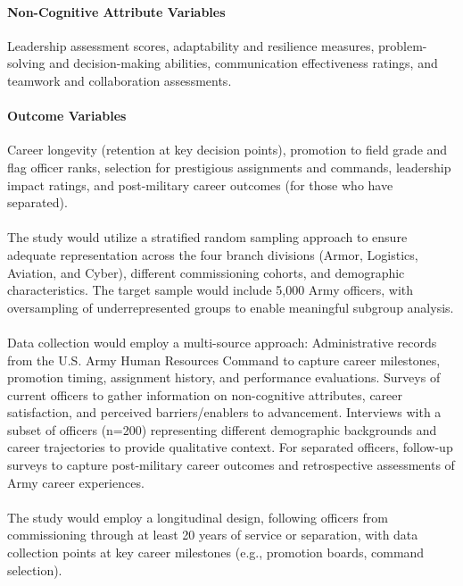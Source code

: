 \documentclass[../main.tex]{subfiles}
\begin{document}
\paragraph{Non-Cognitive Attribute Variables} Leadership assessment scores, adaptability and resilience measures, problem-solving and decision-making abilities, communication effectiveness ratings, and teamwork and collaboration assessments.

\paragraph{Outcome Variables} Career longevity (retention at key decision points), promotion to field grade and flag officer ranks, selection for prestigious assignments and commands, leadership impact ratings, and post-military career outcomes (for those who have separated).


\paragraph{} The study would utilize a stratified random sampling approach to ensure adequate representation across the four branch divisions (Armor, Logistics, Aviation, and Cyber), different commissioning cohorts, and demographic characteristics. The target sample would include 5,000 Army officers, with oversampling of underrepresented groups to enable meaningful subgroup analysis.

\paragraph{} Data collection would employ a multi-source approach: Administrative records from the U.S. Army Human Resources Command to capture career milestones, promotion timing, assignment history, and performance evaluations. Surveys of current officers to gather information on non-cognitive attributes, career satisfaction, and perceived barriers/enablers to advancement. Interviews with a subset of officers (n=200) representing different demographic backgrounds and career trajectories to provide qualitative context. For separated officers, follow-up surveys to capture post-military career outcomes and retrospective assessments of Army career experiences.

\paragraph{} The study would employ a longitudinal design, following officers from commissioning through at least 20 years of service or separation, with data collection points at key career milestones (e.g., promotion boards, command selection).
\end{document}
